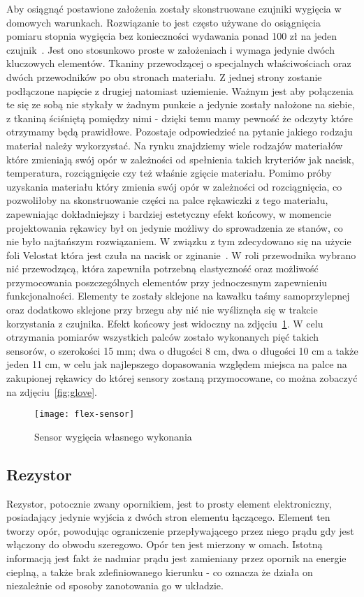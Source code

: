 	Aby osiągnąć postawione założenia zostały skonstruowane czujniki wygięcia w domowych warunkach. Rozwiązanie to jest często używane do osiągnięcia pomiaru stopnia wygięcia bez konieczności wydawania ponad 100 zł na jeden czujnik~\cite{flex-sensor}. Jest ono stosunkowo proste w założeniach i wymaga jedynie dwóch kluczowych elementów. Tkaniny przewodzącej o specjalnych właściwościach oraz dwóch przewodników po obu stronach materiału. Z jednej strony zostanie podłączone napięcie z drugiej natomiast uziemienie. Ważnym jest aby połączenia te się ze sobą nie stykały w żadnym punkcie a jedynie zostały nałożone na siebie, z tkaniną ściśniętą pomiędzy nimi - dzięki temu mamy pewność że odczyty które otrzymamy będą prawidłowe. Pozostaje odpowiedzieć na pytanie jakiego rodzaju materiał należy wykorzystać. Na rynku znajdziemy wiele rodzajów materiałów które zmieniają swój opór w zależności od spełnienia takich kryteriów jak nacisk, temperatura, rozciągnięcie czy też właśnie zgięcie materiału. Pomimo próby uzyskania materiału który zmienia swój opór w zależności od rozciągnięcia, co pozwoliłoby na skonstruowanie części na palce rękawiczki z tego materiału, zapewniając dokładniejszy i bardziej estetyczny efekt końcowy, w momencie projektowania rękawicy był on jedynie możliwy do sprowadzenia ze stanów, co nie było najtańszym rozwiązaniem. W związku z tym zdecydowano się na użycie foli Velostat która jest czuła na nacisk or zginanie~\cite{velostat}. W roli przewodnika wybrano nić przewodzącą, która zapewniła potrzebną elastyczność oraz możliwość przymocowania poszczególnych elementów przy jednoczesnym zapewnieniu funkcjonalności. Elementy te zostały sklejone na kawałku taśmy samoprzylepnej oraz dodatkowo sklejone przy brzegu aby nić nie wyśliznęła się w trakcie korzystania z czujnika. Efekt końcowy jest widoczny na zdjęciu~\ref{fig:sensor}. W celu otrzymania pomiarów wszystkich palców zostało wykonanych pięć takich sensorów, o szerokości 15 mm; dwa o długości 8 cm, dwa o długości 10 cm a także jeden 11 cm, w celu jak najlepszego dopasowania względem miejsca na palce na zakupionej rękawicy do której sensory zostaną przymocowane, co można zobaczyć na zdjęciu~\ref{fig:glove}.
	
\begin{figure}[h]
\centering
\texttt{[image: flex-sensor]}
\caption{Sensor wygięcia własnego wykonania}
\label{fig:sensor}
\end{figure}	

	\subsection{Rezystor}
	\label{subsec:rezystor}	
	Rezystor, potocznie zwany opornikiem, jest to prosty element elektroniczny, posiadający jedynie wyjścia z dwóch stron elementu łączącego. Element ten tworzy opór, powodując ograniczenie przepływającego przez niego prądu gdy jest włączony do obwodu szeregowo. Opór ten jest mierzony w omach. Istotną informacją jest fakt że nadmiar prądu jest zamieniany przez opornik na energie cieplną, a także brak zdefiniowanego kierunku - co oznacza że działa on niezależnie od sposoby zanotowania go w układzie.
	
